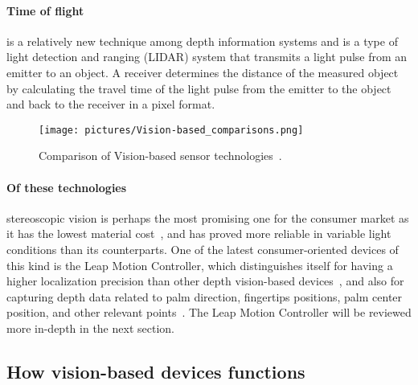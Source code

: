 \paragraph{Time of flight}is a relatively new technique among depth information systems
and is a type of light detection and ranging (LIDAR) system that transmits a light pulse from an emitter to an object. A receiver determines the distance of the measured object by calculating the travel time of the light pulse from the emitter to the object and back to the receiver in a pixel format.

\begin{figure}%
	\texttt{[image: pictures/Vision-based\_comparisons.png]}
	\caption{Comparison of Vision-based sensor technologies~\citep{Ko2012}.}
	\label{fig:VBComparisions}
\end{figure} 

\paragraph{Of these technologies} stereoscopic vision is perhaps the most promising one for the consumer market as it has the lowest material cost~\citep{Ko2012}, and has proved more reliable in variable light conditions than its counterparts. One of the latest consumer-oriented devices of this kind is the Leap Motion Controller, which distinguishes itself for having a higher localization precision than other depth vision-based devices~\citep{Weichert2013}, and also for capturing depth data related to palm direction, fingertips positions, palm center position, and other relevant points~\citep{Wei2016}. The Leap Motion Controller will be reviewed more in-depth in the next section. 

\subsection{How vision-based devices functions}